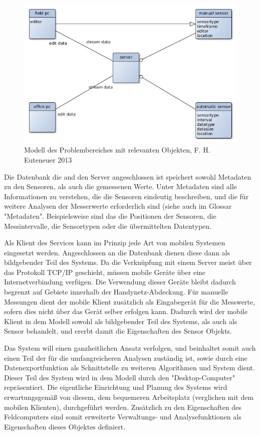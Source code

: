 \begin{figure}[H]
	\centering
 	 \includegraphics[scale=0.6]{graphics/model_of_issue.jpg} 
	\caption{Modell des Problembereiches mit relevanten Objekten, F. H. Euteneuer 2013}
	 \label{fig:model_domain}
\end{figure}

Die Datenbank die and den Server angeschlossen ist speichert sowohl Metadaten zu den Sensoren, als auch die gemessenen Werte. Unter Metadaten sind alle Informationen zu verstehen, die die Sensoren eindeutig beschreiben, und die für weitere Analysen der Messerwerte erforderlich sind (siehe auch im Glossar "Metadaten". Beispielsweise sind das die Positionen der Sensoren, die Messintervalle, die Sensortypen oder die übermittelten Datentypen.

Als Klient des Services kann im Prinzip jede Art von mobilen Systemen eingesetzt werden. Angeschlossen an die Datenbank dienen diese dann als bildgebender Teil des Systems. Da die Verknüpfung mit einem Server meist über das Protokoll TCP/IP geschieht, müssen mobile Geräte über eine Internetverbindung verfügen. Die Verwendung dieser Geräte bleibt dadurch begrenzt auf Gebiete innerhalb der Handynetz-Abdeckung. Für manuelle Messungen dient der mobile Klient zusätzlich als Eingabegerät für die Messwerte, sofern dies nicht über das Gerät selber erfolgen kann. Dadurch wird der mobile Klient in dem Modell sowohl als bildgebender Teil des Systems, als auch als Sensor behandelt, und ererbt damit die Eigenschaften des Sensor Objekts.

Das System will einen ganzheitlichen Ansatz verfolgen, und beinhaltet somit auch einen Teil der für die umfangreicheren Analysen zuständig ist, sowie durch eine Datenexportfunktion als Schnittstelle zu weiteren Algorithmen und System dient. Dieser Teil des System wird in dem Modell durch den "Desktop-Computer" repräsentiert. Die eigentliche Einrichtung und Planung des Systems wird erwartungsgemäß von diesem, dem bequemeren Arbeitsplatz (verglichen mit dem mobilen Klienten), durchgeführt werden. Zusätzlich zu den Eigenschaften des Feldcomputers sind somit erweiterte Verwaltungs- und Analysefunktionen als Eigenschaften dieses Objektes definiert.


